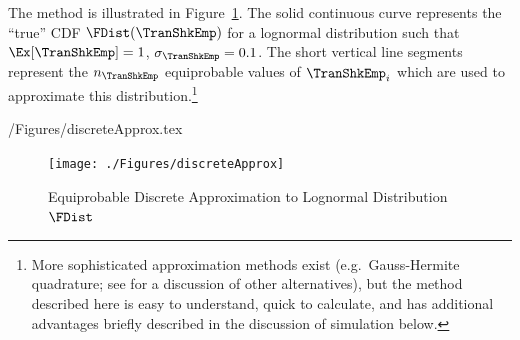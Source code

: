 \documentclass[titlepage, headings=optiontotocandhead]{\econtex}
\begin{document}
The method is illustrated in Figure~\ref{fig:discreteapprox}.  The solid continuous curve represents
the ``true'' CDF $\FDist(\TranShkEmp)$ for a lognormal distribution such that $\Ex[\TranShkEmp] = 1$, $\sigma_{\TranShkEmp} = 0.1$.  The short vertical line segments represent the $n_{\TranShkEmp}$
equiprobable values of $\TranShkEmp_{i}$ which are used to approximate this
distribution.\footnote{More sophisticated approximation methods exist
  (e.g.\ Gauss-Hermite quadrature; see \cite{kopecky2010finite} for a discussion of other alternatives), but the method described here is easy to understand, quick to calculate, and has additional advantages briefly described in the discussion of simulation below.}
\begin{verbatimwrite}{\econtexRoot/Figures/discreteApprox.tex}
  \hypertarget{discreteApprox}{}
  \begin{figure}
    \texttt{[image: ./Figures/discreteApprox]}
    \caption{Equiprobable Discrete Approximation to Lognormal Distribution $\FDist$}
    \label{fig:discreteapprox}
  \end{figure}
\end{verbatimwrite}
\unskip
{}
\end{document}

